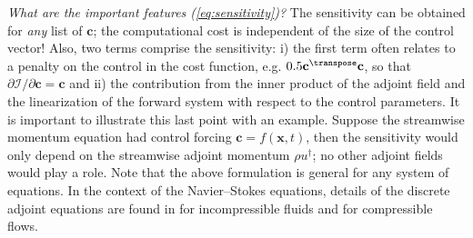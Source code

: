 \textit{What are the important features (\ref{eq:sensitivity})?} The sensitivity can be obtained for \textit{any} list of $\mathbf{c}$; the computational cost is independent of the size of the control vector! Also, two terms comprise the sensitivity: i) the first term often relates to a penalty on the control in the cost function, e.g. $0.5\mathbf{c}^\transpose \mathbf{c}$, so that $\partial \mathcal{I}/\partial \mathbf{c}=\mathbf{c}$  and ii) the contribution from the inner product of the adjoint field and the linearization of the forward system with respect to the control parameters. It is important to illustrate this last point with an example. Suppose the streamwise momentum equation had control forcing $\mathbf{c}=f(\mathbf{x},t)$, then the sensitivity would only depend on the streamwise adjoint momentum $\rho u^\dagger$; no other adjoint fields would play a role. Note that the above formulation is general for any system of equations. In the context of the Navier--Stokes equations, details of the discrete adjoint equations are found in \citet{wang2019discrete} for incompressible fluids and \citet{vishnampet2015practical,vishnampet2015exact} for compressible flows.

